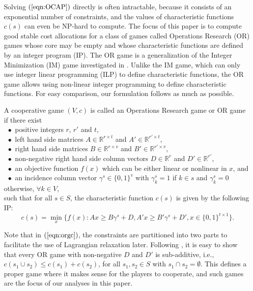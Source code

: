 \documentclass[ijoc,nonblindrev]{informs3} %
\newcommand{\R}{\mathbb{R}}
\begin{document}
Solving $(\ref{eqn:OCAP})$ directly is often intractable, because it consists of an exponential number of constraints, and the values of characteristic functions $c(s)$ can even be NP-hard to compute.
The focus of this paper is to compute good stable cost allocations for a class of games called Operations Research (OR) games whose core may be empty and whose characteristic functions are defined by an integer program (IP). The OR game is a generalization of the Integer Minimization (IM) game investigated in \cite{Caprara2010LPB}. Unlike the IM game,  which can only use integer linear programming (ILP) to define  characteristic functions, the OR game allows using non-linear integer programming to define characteristic functions. For easy comparison, our formulation follows \cite{Caprara2010LPB} as much as possible.

\begin{definition}\label{def2}
A cooperative game $(V,c)$ is called an Operations Research game or OR game if there exist\\
$~~\bullet$ positive integers $r$, $r'$ and $t$,\\
$~~\bullet$ left hand side matrices $A \in \R^{r \times t}$ and $A' \in \R^{r' \times t}$,\\
$~~\bullet$ right hand side matrices $B \in \R^{r \times v}$ and $B' \in \R^{r' \times v}$,\\
$~~\bullet$ non-negative right hand side column vectors $D \in \R^{r}$ and $D' \in \R^{r'}$,\\
$~~\bullet$ an objective function $f(x)$ which can be either linear or nonlinear in $x$, and\\
$~~\bullet$ an incidence column vector $\gamma^s \in \{0,1\}^v$ with $\gamma_k^s=1$ if $k \in s$ and $\gamma_k^s=0$ otherwise, $\forall k \in V$,\\
such that for all $s \in S$, the characteristic function $c(s)$ is given by   the following IP:
\begin{equation}\label{eqn:orgc}
c(s) = \min_{x} \big\{ f(x):Ax \geq B\gamma^s + D, A'x \geq B'\gamma^s + D', x \in \{0,1\}^{t \times 1} \big\}.
\end{equation}
\end{definition}
Note that in $(\ref{eqn:orgc})$, the constraints are partitioned into two parts to facilitate the use of Lagrangian relaxation later. Following \cite{Caprara2010LPB}, it is easy to show that every OR game with non-negative $D$ and $D'$ is sub-additive, i.e., $c(s_1 \cup s_2) \leq c(s_1) + c(s_2)$, for all $s_1,s_2 \in S$ with $s_1 \cap s_2 = \emptyset$. This defines a proper game where it makes sense for the players to cooperate, and such games are the focus of our analyses in this paper.
\end{document}
